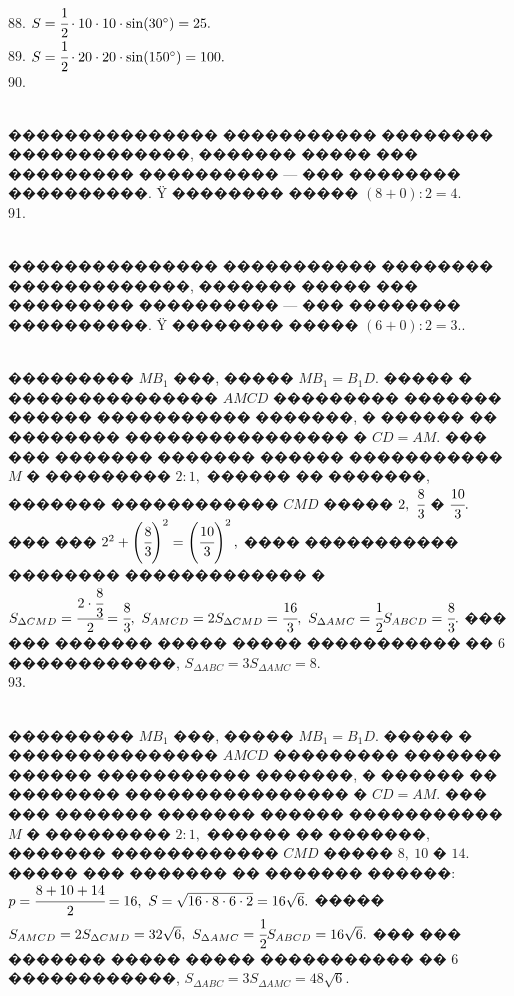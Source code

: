 \documentclass[12pt]{article}
\begin{document}
88. $S=\cfrac{1}{2}\cdot10\cdot10\cdot \sin(30^\circ)=25.$\\
89. $S=\cfrac{1}{2}\cdot20\cdot20\cdot \sin(150^\circ)=100.$\\
90. \begin{figure}[ht!]
\end{figure}\\
��������������� ����������� �������� �������������, ������� ����� ��� ��������� ���������� --- ��� �������� ����������. Ÿ �������� ����� $(8+0):2=4.$\\
91. \begin{figure}[ht!]
\end{figure}\\
��������������� ����������� �������� �������������, ������� ����� ��� ��������� ���������� --- ��� �������� ����������. Ÿ �������� ����� $(6+0):2=3.$\newpage{}. \begin{figure}[ht!]
\end{figure}\\
��������� $MB_1$ ���, ����� $MB_1=B_1D.$ ����� � ��������������� $AMCD$ ��������� ������� ������ ����������� �������, � ������ �� �������� ���������������� � $CD=AM.$ ��� ��� ������� ������� ������ ����������� $M$ � ��������� $2:1,$ ������ �� �������, ������� ������������ $CMD$ ����� $2,\ \cfrac{8}{3}$ � $\cfrac{10}{3}.$ ��� ��� $2^2+\left(\cfrac{8}{3}\right)^2=\left(\cfrac{10}{3}\right)^2,$ ���� ����������� �������� ������������� �  $S_{\Delta CMD}=\cfrac{2\cdot\cfrac{8}{3}}{2}=\cfrac{8}{3},\ S_{AMCD}=2S_{\Delta CMD}=\cfrac{16}{3},\ S_{\Delta AMC}=\cfrac{1}{2}S_{ABCD}=\cfrac{8}{3}.$ ��� ��� ������� ����� ����� ����������� �� 6 ������������, $S_{\Delta ABC}=3S_{\Delta AMC}=8.$\\
93. \begin{figure}[ht!]
\end{figure}\\
��������� $MB_1$ ���, ����� $MB_1=B_1D.$ ����� � ��������������� $AMCD$ ��������� ������� ������ ����������� �������, � ������ �� �������� ���������������� � $CD=AM.$ ��� ��� ������� ������� ������ ����������� $M$ � ��������� $2:1,$ ������ �� �������, ������� ������������ $CMD$ ����� $8,\ 10$ � $14.$ ����� ��� ������� �� ������� ������: $p=\cfrac{8+10+14}{2}=16,\ S=\sqrt{16\cdot8\cdot6\cdot2}=16\sqrt{6}.$ ����� $S_{AMCD}=2S_{\Delta CMD}=32\sqrt{6},\ S_{\Delta AMC}=\cfrac{1}{2}S_{ABCD}=16\sqrt{6}.$ ��� ��� ������� ����� ����� ����������� �� 6 ������������, $S_{\Delta ABC}=3S_{\Delta AMC}=48\sqrt{6}.$\newpage\noindent
\end{document}
